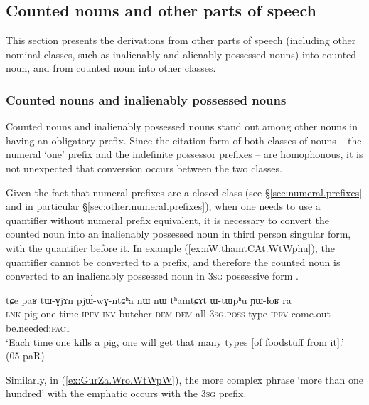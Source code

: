 \subsection{Counted nouns and other parts of speech} \label{sec:CN.parts.of.speech}

This section presents the derivations from other parts of speech (including other nominal classes, such as inalienably and alienably possessed nouns) into counted noun, and from counted noun into other classes.

\subsubsection{Counted nouns and inalienably possessed nouns}   \label{sec:CN.IPN}
Counted nouns and inalienably possessed nouns stand out among other nouns in having an obligatory prefix. Since the citation form of both classes of nouns -- the numeral `one' prefix  and the indefinite possessor prefixes  -- are homophonous, it is not unexpected that conversion occurs between the two classes. 

Given the fact that numeral prefixes are a closed class (see §\ref{sec:numeral.prefixes} and in particular §\ref{sec:other.numeral.prefixes}), when one needs to use a quantifier without numeral prefix equivalent, it is necessary to convert the counted noun into an inalienably possessed noun in third person singular form, with the quantifier before it. In example (\ref{ex:nW.thamtCAt.WtWphu}), the quantifier  cannot be converted to a prefix, and therefore the counted noun  is converted to an inalienably possessed noun in \textsc{3sg} possessive form .

\begin{exe}
\ex \label{ex:nW.thamtCAt.WtWphu}
\gll tɕe paʁ tɯ-ɣjɤn pjɯ́-wɣ-ntɕʰa nɯ nɯ tʰamtɕɤt ɯ-tɯpʰu ɲɯ-ɬoʁ ra \\ 
 \textsc{lnk} pig one-time \textsc{ipfv}-\textsc{inv}-butcher \textsc{dem} \textsc{dem} all \textsc{3sg}.\textsc{poss}-type \textsc{ipfv}-come.out be.needed:\textsc{fact} \\
\glt `Each time one kills a pig, one will get that many types [of foodstuff from it].' (05-paR)
\end{exe}

Similarly, in (\ref{ex:GurZa.Wro.WtWpW}), the more complex phrase  `more than one hundred' with the emphatic  occurs with the \textsc{3sg} prefix.

